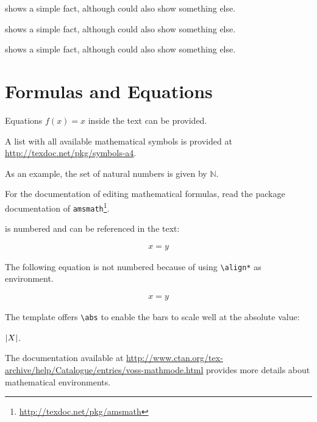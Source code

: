 \begin{ltgexample}
 shows a simple fact, although  could also show something else.

 shows a simple fact, although  could also show something else.

 shows a simple fact, although  could also show something else.
\end{ltgexample}

\section{Formulas and Equations}

\begin{ltgexample}
Equations $f(x)=x$ inside the text can be provided.
\end{ltgexample}

A list with all available mathematical symbols is provided at \url{http://texdoc.net/pkg/symbols-a4}.

\begin{ltgexample}
As an example, the set of natural numbers is given by $\mathbb{N}$.
\end{ltgexample}

For the documentation of editing mathematical formulas, read the package documentation of \texttt{amsmath}\footnote{\url{http://texdoc.net/pkg/amsmath}}.

 is numbered and can be referenced in the text:
\begin{ltgexample}
\begin{align}
  \label{eq:test}
  x = y
\end{align}
\end{ltgexample}

The following equation is not numbered because of using \texttt{\textbackslash align*} as environment.
\begin{ltgexample}
\begin{align*}
  x = y
\end{align*}
\end{ltgexample}

The template offers \verb+\abs+ to enable the bars to scale well at the absolute value:
\begin{ltgexample}
$\left\lvert X\right\rvert$.
\end{ltgexample}

The documentation available at \url{http://www.ctan.org/tex-archive/help/Catalogue/entries/voss-mathmode.html} provides more details about mathematical environments.

